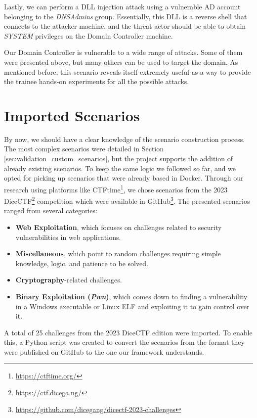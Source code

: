 Lastly, we can perform a DLL injection attack using a vulnerable AD account belonging to the \textit{DNSAdmins} group. Essentially, this DLL is a reverse shell that connects to the attacker machine, and the threat actor should be able to obtain \textit{SYSTEM} privileges on the Domain Controller machine. 

Our Domain Controller is vulnerable to a wide range of attacks. Some of them were presented above, but many others can be used to target the domain. As mentioned before, this scenario reveals itself extremely useful as a way to provide the trainee hands-on experiments for all the possible attacks.

\section{Imported Scenarios} \label{sec:validation_imported_scenarios}

By now, we should have a clear knowledge of the scenario construction process. The most complex scenarios were detailed in Section \ref{sec:validation_custom_scenarios}, but the project supports the addition of already existing scenarios. To keep the same logic we followed so far, and we opted for picking up scenarios that were already based in Docker. Through our research using platforms like CTFtime\footnote{\url{https://ctftime.org/}}, we chose scenarios from the 2023 DiceCTF\footnote{\url{https://ctf.dicega.ng/}} competition which were available in GitHub\footnote{\url{https://github.com/dicegang/dicectf-2023-challenges}}. The presented scenarios ranged from several categories:

\begin{itemize}
    \item \textbf{Web Exploitation}, which focuses on challenges related to security vulnerabilities in web applications.
    \item \textbf{Miscellaneous}, which point to random challenges requiring simple knowledge, logic, and patience to be solved.
    \item \textbf{Cryptography}-related challenges.
    \item \textbf{Binary Exploitation (\textit{Pwn})}, which comes down to finding a vulnerability in a Windows executable or Linux ELF and exploiting it to gain control over it.
\end{itemize}

A total of 25 challenges from the 2023 DiceCTF edition were imported. To enable this, a Python script was created to convert the scenarios from the format they were published on GitHub to the one our framework understands.

